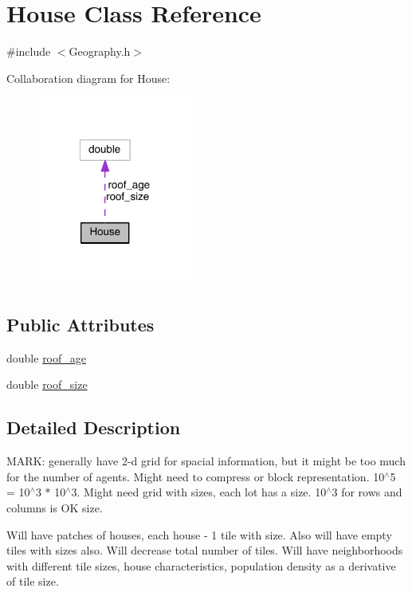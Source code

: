 \hypertarget{class_house}{}\section{House Class Reference}
\label{class_house}


{\ttfamily \#include $<$Geography.\+h$>$}



Collaboration diagram for House\+:\nopagebreak
\begin{figure}[H]
\begin{center}
\leavevmode
\includegraphics[width=146pt]{class_house__coll__graph}
\end{center}
\end{figure}
\subsection*{Public Attributes}
\begin{DoxyCompactItemize}
\item 
double \hyperlink{class_house_a30c17e1166d2dcb0514d6fc25f7c9e9d}{roof\+\_\+age}
\item 
double \hyperlink{class_house_a8b9b7814c17814f6df74c5bfb13d5b74}{roof\+\_\+size}
\end{DoxyCompactItemize}


\subsection{Detailed Description}
M\+A\+R\+K\+: generally have 2-\/d grid for spacial information, but it might be too much for the number of agents. Might need to compress or block representation. 10$^\wedge$5 = 10$^\wedge$3 $\ast$ 10$^\wedge$3. Might need grid with sizes, each lot has a size. 10$^\wedge$3 for rows and columns is O\+K size.

Will have patches of houses, each house -\/ 1 tile with size. Also will have empty tiles with sizes also. Will decrease total number of tiles. Will have neighborhoods with different tile sizes, house characteristics, population density as a derivative of tile size.

